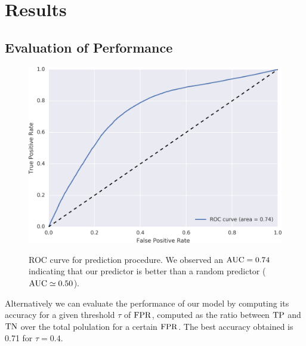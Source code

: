 \section{Results}

\subsection{Evaluation of Performance}

\begin{figure}[h]
\begin{center}
{\includegraphics[width=0.9\columnwidth]
{figures/ROC_BETA/ROC_Beta_based_approach_201504.png}}
\caption{ROC curve for prediction procedure. We observed an $\operatorname{AUC} = 0.74$ indicating that our predictor is better than a random predictor ($\operatorname{AUC} \simeq 0.50$).}
\label{ROC_multiclass}
\end{center}
\end{figure}

Alternatively we can evaluate the performance of our model by computing its accuracy for a given threshold $\tau$ of $\operatorname{FPR}$, computed as the ratio between $\operatorname{TP}$ and $\operatorname{TN}$ over the total polulation for a certain $\operatorname{FPR}$. The best accuracy obtained is \num{0.71} for $\tau = 0.4$.
